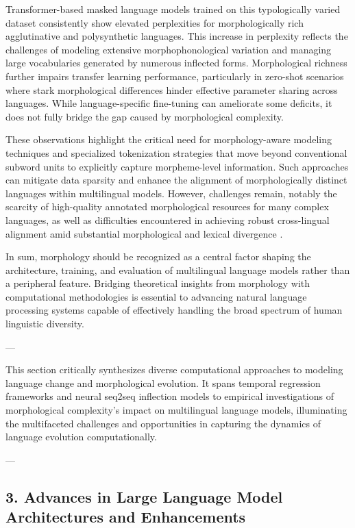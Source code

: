 \documentclass[11pt]{article}
\begin{document}
Transformer-based masked language models trained on this typologically varied dataset consistently show elevated perplexities for morphologically rich agglutinative and polysynthetic languages. This increase in perplexity reflects the challenges of modeling extensive morphophonological variation and managing large vocabularies generated by numerous inflected forms. Morphological richness further impairs transfer learning performance, particularly in zero-shot scenarios where stark morphological differences hinder effective parameter sharing across languages. While language-specific fine-tuning can ameliorate some deficits, it does not fully bridge the gap caused by morphological complexity.

These observations highlight the critical need for morphology-aware modeling techniques and specialized tokenization strategies that move beyond conventional subword units to explicitly capture morpheme-level information. Such approaches can mitigate data sparsity and enhance the alignment of morphologically distinct languages within multilingual models. However, challenges remain, notably the scarcity of high-quality annotated morphological resources for many complex languages, as well as difficulties encountered in achieving robust cross-lingual alignment amid substantial morphological and lexical divergence \cite{ref34}.

In sum, morphology should be recognized as a central factor shaping the architecture, training, and evaluation of multilingual language models rather than a peripheral feature. Bridging theoretical insights from morphology with computational methodologies is essential to advancing natural language processing systems capable of effectively handling the broad spectrum of human linguistic diversity.

---

This section critically synthesizes diverse computational approaches to modeling language change and morphological evolution. It spans temporal regression frameworks and neural seq2seq inflection models to empirical investigations of morphological complexity’s impact on multilingual language models, illuminating the multifaceted challenges and opportunities in capturing the dynamics of language evolution computationally.

---

\subsection{3. Advances in Large Language Model Architectures and Enhancements}
\end{document}

